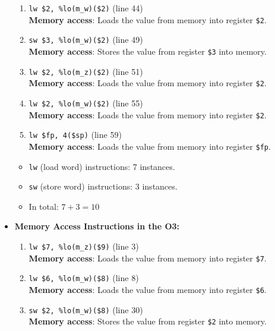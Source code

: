 \begin{itemize}
\begin{enumerate}
    \item \texttt{lw \$2, \%lo(m\_w)(\$2)} (line 44) \\
    \textbf{Memory access}: Loads the value from memory into register \texttt{\$2}.

    \item \texttt{sw \$3, \%lo(m\_w)(\$2)} (line 49) \\
    \textbf{Memory access}: Stores the value from register \texttt{\$3} into memory.

    \item \texttt{lw \$2, \%lo(m\_z)(\$2)} (line 51) \\
    \textbf{Memory access}: Loads the value from memory into register \texttt{\$2}.

    \item \texttt{lw \$2, \%lo(m\_w)(\$2)} (line 55) \\
    \textbf{Memory access}: Loads the value from memory into register \texttt{\$2}.

    \item \texttt{lw \$fp, 4(\$sp)} (line 59) \\
    \textbf{Memory access}: Loads the value from memory into register \texttt{\$fp}.
\end{enumerate}

\begin{itemize}
    \item \texttt{lw} (load word) instructions: 7 instances.
    \item \texttt{sw} (store word) instructions: 3 instances.
    \item In total: $7 + 3 = \boxed{10}$
\end{itemize}

\item \textbf{Memory Access Instructions in the O3:}

\begin{enumerate}
    \tiny
    \item \texttt{lw \$7, \%lo(m\_z)(\$9)} (line 3) \\
    \textbf{Memory access}: Loads the value from memory into register \texttt{\$7}.

    \item \texttt{lw \$6, \%lo(m\_w)(\$8)} (line 8) \\
    \textbf{Memory access}: Loads the value from memory into register \texttt{\$6}.

    \item \texttt{sw \$2, \%lo(m\_w)(\$8)} (line 30) \\
    \textbf{Memory access}: Stores the value from register \texttt{\$2} into memory.


\end{enumerate}
\end{itemize}
